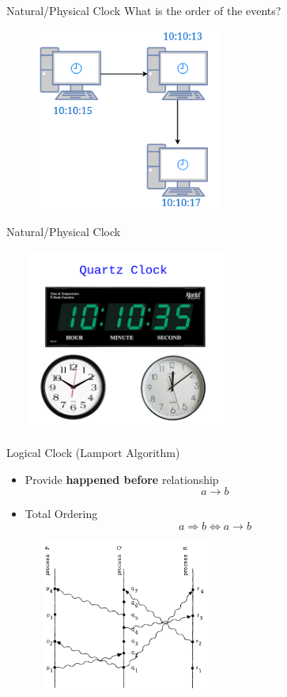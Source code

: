 \documentclass{beamer}
\begin{document}
\begin{frame}{Natural/Physical Clock}
\color{red} {What is the order of the events?}

		\begin{center}
   	 		\includegraphics[width=0.6\textwidth, height=60mm, scale=1]{img/ds-clock-2.png
}
  		\end{center}
\end{frame}


\begin{frame}{Natural/Physical Clock}
		\begin{center}
   	 		\includegraphics[width=0.6\textwidth, height=60mm, scale=1]{img/ds-clock3.png}
  		\end{center}
\end{frame}


\begin{frame}{Logical Clock (Lamport Algorithm)}
\begin{itemize}
    \item Provide \textbf{happened before} relationship $$ a\rightarrow{b} $$
    \item Total Ordering $$ a\Rightarrow{b} \Longleftrightarrow a\rightarrow{b} $$
  \end{itemize}
		\begin{center}
   	 		\includegraphics[width=0.6\textwidth, height=50mm, scale=1]{img/ds-clock-4.png}
  		\end{center}
\end{frame}
\end{document}
